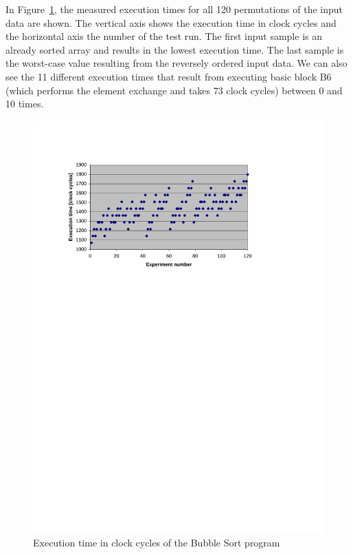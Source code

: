 In Figure~\ref{fig:results:wcet:sort}, the measured execution times
for all 120 permutations of the input data are shown. The vertical
axis shows the execution time in clock cycles and the horizontal
axis the number of the test run. The first input sample is an
already sorted array and results in the lowest execution time. The
last sample is the worst-case value resulting from the reversely
ordered input data. We can also see the 11 different execution times
that result from executing basic block B6 (which performs the
element exchange and takes 73 clock cycles) between 0 and 10 times.

\begin{figure}
    \centering
    \includegraphics[width=\excelwidth]{results/results_wcet_sort}
    \caption{Execution time in clock cycles of the Bubble Sort program}
    \label{fig:results:wcet:sort}
\end{figure}

